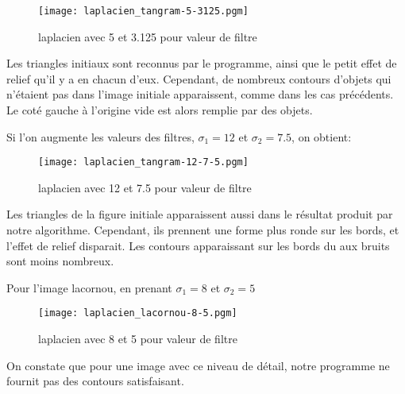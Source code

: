 \documentclass[12pt]{article}
\numberwithin{equation}{section}
\begin{document}
	\begin{figure}[!ht]
        \begin{center}
           \texttt{[image: laplacien\_tangram-5-3125.pgm]} 
           \caption{laplacien avec 5 et 3.125 pour valeur de filtre}
        \end{center}
    \end{figure}

Les triangles initiaux sont reconnus par le programme, ainsi que le petit effet de relief qu'il y a en chacun d'eux. Cependant, de nombreux contours d'objets qui n'étaient pas dans l'image initiale apparaissent, comme dans les cas précédents. Le coté gauche à l'origine vide est alors remplie par des objets.

Si l'on augmente les valeurs des filtres, $\sigma_1=12$ et $\sigma_2=7.5$, on obtient:

	\begin{figure}[!ht]
        \begin{center}
           \texttt{[image: laplacien\_tangram-12-7-5.pgm]} 
           \caption{laplacien avec 12 et 7.5 pour valeur de filtre}
        \end{center}
    \end{figure}

Les triangles de la figure initiale apparaissent aussi dans le résultat produit par notre algorithme. Cependant, ils prennent une forme plus ronde sur les bords, et l'effet de relief disparait. Les contours apparaissant sur les bords du aux bruits sont moins nombreux.

Pour l'image lacornou, en prenant $\sigma_1=8$ et $\sigma_2=5$

	\begin{figure}[!ht]
        \begin{center}
           \texttt{[image: laplacien\_lacornou-8-5.pgm]} 
           \caption{laplacien avec 8 et 5 pour valeur de filtre}
        \end{center}
    \end{figure}

On constate que pour une image avec ce niveau de détail, notre programme ne fournit pas des contours satisfaisant.
\end{document}
